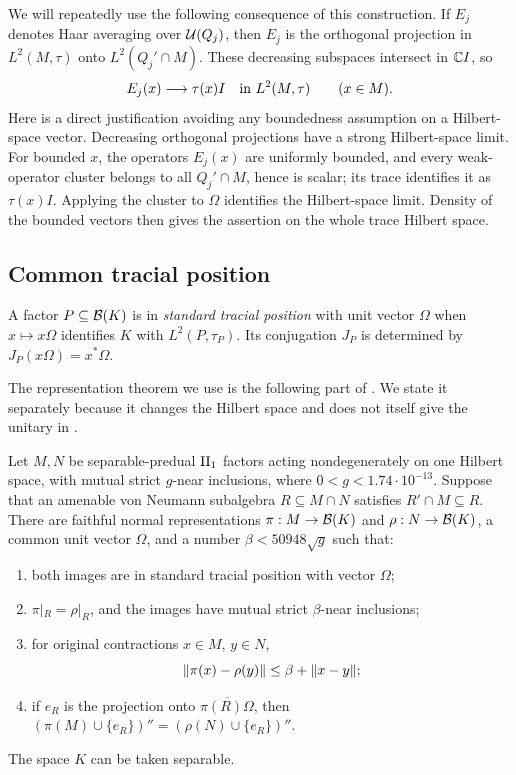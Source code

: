 We will repeatedly use the following consequence of this construction.
If $E_j$ denotes Haar averaging over $\mathcal U(Q_j)$, then $E_j$ is the
orthogonal projection in $L^2(M,\tau)$ onto $L^2(Q_j'\cap M)$.
These decreasing subspaces intersect in $\mathbb C I$, so
\begin{equation}
 E_j(x)\longrightarrow\tau(x)I\quad\hbox{in }L^2(M,\tau)
 \qquad(x\in M).
 \label{eq:irreducible-averages}
\end{equation}
Here is a direct justification avoiding any boundedness assumption on a
Hilbert-space vector.  Decreasing orthogonal projections have a strong
Hilbert-space limit.  For bounded $x$, the operators $E_j(x)$ are uniformly
bounded, and every weak-operator cluster belongs to all $Q_j'\cap M$,
hence is scalar; its trace identifies it as $\tau(x)I$.  Applying the
cluster to $\Omega$ identifies the Hilbert-space limit.  Density of the
bounded vectors then gives the assertion on the whole trace Hilbert space.

\subsection{Common tracial position}

A factor $P\subseteq\mathcal B(K)$ is in \emph{standard tracial position}
with unit vector $\Omega$ when $x\mapsto x\Omega$ identifies $K$
with $L^2(P,\tau_P)$. Its conjugation $J_P$ is determined by
$J_P(x\Omega)=x^*\Omega$.

The representation theorem we use is the following part of
\citet[Lemma~4.10]{CCSSWW2014}.  We state it separately because it changes
the Hilbert space and does not itself give the unitary in
.

\begin{proposition}
\label{prop:finite-common-position}
Let $M,N$ be separable-predual $\mathrm{II}_1$ factors acting nondegenerately on
one Hilbert space, with mutual strict $g$-near inclusions, where
$0<g<1.74\cdot10^{-13}$.  Suppose that an amenable von Neumann subalgebra
$R\subseteq M\cap N$ satisfies $R'\cap M\subseteq R$.  There are
faithful normal representations $\pi:M\to\mathcal B(K)$ and
$\rho:N\to\mathcal B(K)$, a common unit vector $\Omega$, and a number
$\beta<50948\sqrt g$ such that:
\begin{enumerate}[label=(\roman*),leftmargin=*]
\item both images are in standard tracial position with vector $\Omega$;
\item $\pi|_R=\rho|_R$, and the images have mutual strict
$\beta$-near inclusions;
\item for original contractions $x\in M$, $y\in N$,
\[
 \lVert\pi(x)-\rho(y)\rVert\le\beta+\lVert x-y\rVert;
\]
\item if $e_R$ is the projection onto $\overline{\pi(R)\Omega}$,
then $(\pi(M)\cup\{e_R\})''=(\rho(N)\cup\{e_R\})''$.
\end{enumerate}
The space $K$ can be taken separable.
\end{proposition}

